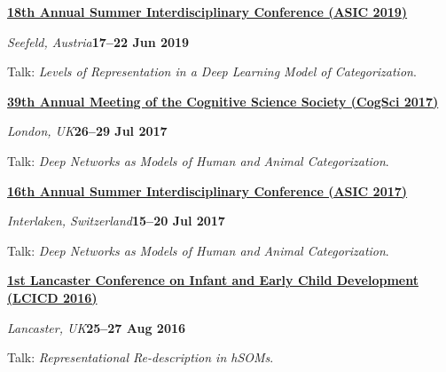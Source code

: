 \documentclass[10pt]{article}
\newenvironment{outerlist}[1][\enskip\textbullet]%
        {\begin{itemize}[#1]}{\end{itemize}%
         \vspace{-.6\baselineskip}}
\newenvironment{innerlist}[1][\enskip\textbullet]%
        {\begin{compactitem}[#1]}{\end{compactitem}}
\begin{document}
\textbf{\href{http://www.cogs.indiana.edu/asic/2019/index.shtml}{18th Annual Summer Interdisciplinary Conference (ASIC 2019)}}
\begin{outerlist}
  \item[] \textit{Seefeld, Austria}\hfill\textbf{17--22 Jun 2019}
  \begin{innerlist}
    \item Talk: \textit{Levels of Representation in a Deep Learning Model of Categorization}.
  \end{innerlist}
\end{outerlist}
\vspace{8pt}

\textbf{\href{http://www.cognitivesciencesociety.org/conference/cogsci2017/}{ 39th Annual Meeting of the Cognitive Science Society (CogSci 2017)}}
\begin{outerlist}
  \item[] \textit{London, UK}\hfill\textbf{26--29 Jul 2017}
  \begin{innerlist}
    \item Talk: \textit{Deep Networks as Models of Human and Animal Categorization}.
  \end{innerlist}
\end{outerlist}
\vspace{8pt}

\begin{samepage}

\textbf{\href{http://www.cogs.indiana.edu/asic/2017/index.shtml}{16th Annual Summer Interdisciplinary Conference (ASIC 2017)}}
\begin{outerlist}
  \item[] \textit{Interlaken, Switzerland}\hfill\textbf{15--20 Jul 2017}
  \begin{innerlist}
    \item Talk: \textit{Deep Networks as Models of Human and Animal Categorization}.
  \end{innerlist}
\end{outerlist}

\vspace{8pt}\end{samepage}

\textbf{\href{http://wp.lancs.ac.uk/lcicd/past-events/}{1st Lancaster Conference on Infant and Early Child Development (LCICD 2016)}}
\begin{outerlist}
  \item[] \textit{Lancaster, UK}\hfill\textbf{25--27 Aug 2016}
  \begin{innerlist}
    \item Talk: \textit{Representational Re-description in hSOMs}.
  \end{innerlist}
\end{outerlist}
\vspace{8pt}
\end{document}
